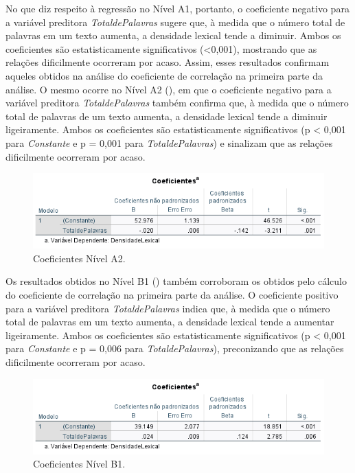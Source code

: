 \documentclass[portuguese]{textolivre}
\begin{document}
No que diz respeito à regressão no Nível A1, portanto, o coeficiente negativo para a variável preditora \textit{TotaldePalavras} sugere que, à medida que o número total de palavras em um texto aumenta, a densidade lexical tende a diminuir. Ambos os coeficientes são estatisticamente significativos (<0,001), mostrando que as relações dificilmente ocorreram por acaso. Assim, esses resultados confirmam aqueles obtidos na análise do coeficiente de correlação na primeira parte da análise. O mesmo ocorre no Nível A2 (), em que o coeficiente negativo para a variável preditora \textit{TotaldePalavras} também confirma que, à medida que o número total de palavras de um texto aumenta, a densidade lexical tende a diminuir ligeiramente. Ambos os coeficientes são estatisticamente significativos (p < 0,001 para \textit{Constante} e p = 0,001 para \textit{TotaldePalavras}) e sinalizam que as relações dificilmente ocorreram por acaso. 

\begin{figure}[h!]
    \centering
    \includegraphics[width=0.8\linewidth]{Fig17.png}
    \caption{Coeficientes Nível A2.}
    \label{fig17}
\end{figure}

Os resultados obtidos no Nível B1 () também corroboram os obtidos pelo cálculo do coeficiente de correlação na primeira parte da análise. O coeficiente positivo para a variável preditora \textit{TotaldePalavras} indica que, à medida que o número total de palavras em um texto aumenta, a densidade lexical tende a aumentar ligeiramente. Ambos os coeficientes são estatisticamente significativos (p < 0,001 para \textit{Constante} e p = 0,006 para \textit{TotaldePalavras}), preconizando que as relações dificilmente ocorreram por acaso.

\begin{figure}[h!]
    \centering
    \includegraphics[width=0.8\linewidth]{Fig18.png}
    \caption{Coeficientes Nível B1.}
    \label{fig18}
\end{figure}
\end{document}
